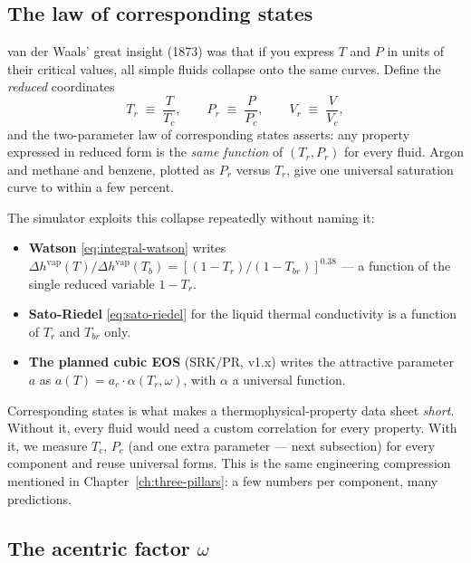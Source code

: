 \documentclass[11pt,a4paper]{article}
\begin{document}
\subsection{The law of corresponding states}

van der Waals' great insight (1873) was that if you express $T$ and
$P$ in units of their critical values, all simple fluids collapse
onto the same curves.  Define the \emph{reduced} coordinates
\begin{equation}
   T_r \;\equiv\; \frac{T}{T_c}, \qquad
   P_r \;\equiv\; \frac{P}{P_c}, \qquad
   V_r \;\equiv\; \frac{V}{V_c},
\end{equation}
and the two-parameter law of corresponding states asserts: any
property expressed in reduced form is the \emph{same function} of
$(T_r, P_r)$ for every fluid.  Argon and methane and benzene,
plotted as $P_r$ versus $T_r$, give one universal saturation curve
to within a few percent.

The simulator exploits this collapse repeatedly without naming it:
\begin{itemize}[leftmargin=*,nosep]
  \item \textbf{Watson} \eqref{eq:integral-watson} writes
        $\Delta h^{\mathrm{vap}}(T) / \Delta h^{\mathrm{vap}}(T_b)
        = [(1 - T_r)/(1 - T_{br})]^{0.38}$ --- a function of the
        single reduced variable $1 - T_r$.
  \item \textbf{Sato-Riedel} \eqref{eq:sato-riedel} for the
        liquid thermal conductivity is a function of $T_r$ and
        $T_{br}$ only.
  \item \textbf{The planned cubic EOS} (SRK/PR, v1.x) writes the
        attractive parameter $a$ as $a(T) = a_c \cdot \alpha(T_r,
        \omega)$, with $\alpha$ a universal function.
\end{itemize}

\begin{intuition}
Corresponding states is what makes a thermophysical-property data
sheet \emph{short}.  Without it, every fluid would need a custom
correlation for every property.  With it, we measure $T_c$, $P_c$
(and one extra parameter --- next subsection) for every component
and reuse universal forms.  This is the same engineering compression
mentioned in Chapter~\ref{ch:three-pillars}: a few numbers per
component, many predictions.
\end{intuition}

\subsection{The acentric factor $\omega$}
\end{document}
